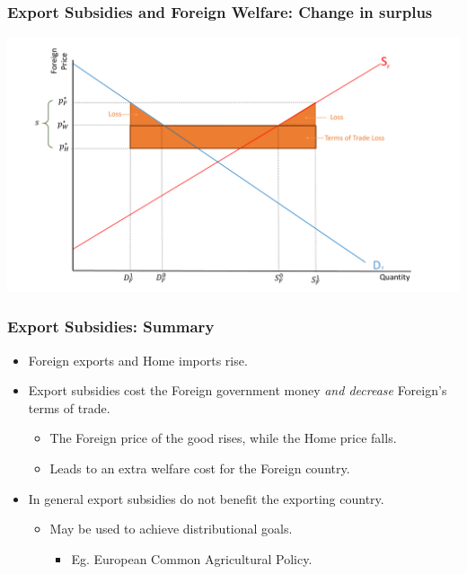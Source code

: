 \documentclass{beamer}
\begin{document}
\begin{frame}
	\frametitle{Export Subsidies and Foreign Welfare:  Change in surplus}
	
	\includegraphics[scale=0.3]{SL_27.pdf}
	
\end{frame}

\begin{frame}
	\frametitle{Export Subsidies:  Summary}
	
	\begin{itemize}
		\item Foreign exports and Home imports rise.
		\item Export subsidies cost the Foreign government money \emph{and decrease} Foreign's terms of trade.
		\begin{itemize}
			\item The Foreign price of the good rises, while the Home price falls.
			\item Leads to an extra welfare cost for the Foreign country.
		\end{itemize}
		\item In general export subsidies do not benefit the exporting country. 
		\begin{itemize}
			\item May be used to achieve distributional goals. 
			\begin{itemize}
				\item Eg. European Common Agricultural Policy.
			\end{itemize} 
		\end{itemize}
		
	\end{itemize}
	
\end{frame}
\end{document}
